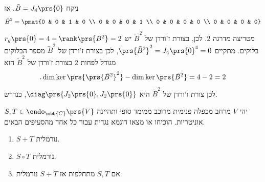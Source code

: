 \documentclass[a4paper,10pt,twoside,openany]{book}
\begin{document}
\begin{solution}
\begin{enumerate}
ניקח
$\tilde{B} =  J_4\prs{0}$.
אז
\[\tilde{B}^2 = \pmat{0 & 0 & 1 & 0 \\ 0 & 0 & 0 & 1 \\ 0 & 0 & 0 & 0 \\ 0 & 0 & 0 & 0}\]
מטריצה מדרגה
$2$.
לכן, בצורת ז'ורדן של
$\tilde{B}^2$
יש
$r_g\prs{0} = 4 - \rank\prs{B^2} = 2$
בלוקים.
מתקיים
$\prs{\tilde{B}^2}^2 = J_4\prs{0}^4 = 0$,
לכן בצורת ז'ורדן של
$\tilde{B}^2$
מספר הבלוקים מגודל לפחות
$2$
בצורת ז'ורדן של
$\tilde{B}^2$
הוא
\[\text{.} \dim \ker\prs{\prs{\tilde{B}^2}^2} - \dim \ker\prs{\tilde{B}^2} = 4 - 2 = 2\]
לכן צורת ז'ורדן של
$\tilde{B}^2$
היא
$\diag\prs{J_2\prs{0}, J_2\prs{0}}$,
כנדרש.

\end{enumerate}
\end{solution}

\begin{exercisechap}
יהי
$V$
מרחב מכפלה פנימית מרוכב ממימד סופי ותהיינה
$S,T \in \endo_{\mbb{C}}\prs{V}$
אוניטריות.
הוכיחו או מצאו דוגמא נגדית עבור כל אחד מהסעיפים הבאים.

\begin{enumerate}
\item $S+T$
נורמלית.
\item $S \circ T$
נורמלית.
\item אם
$S,T$
מתחלפות אז
$S+T$
נורמלית.
\end{enumerate}
\end{exercisechap}
\end{document}

